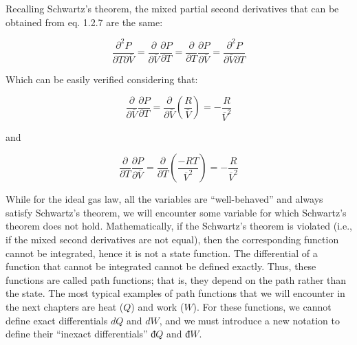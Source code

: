 \documentclass[
  9pt,
]{extbook}
\theoremstyle{definition}
\theoremstyle{definition}
\theoremstyle{definition}
\theoremstyle{remark}
\begin{document}
Recalling Schwartz's theorem, the mixed partial second derivatives that can be obtained from eq. 1.2.7 are the same:

\begin{equation}
  \frac{\partial^2 P}{\partial T \partial \overline{V}}=\frac{\partial}{\partial \overline{V}}\frac{\partial P}{\partial T}=\frac{\partial}{\partial T}\frac{\partial P}{\partial \overline{V}}=\frac{\partial^2 P}{\partial \overline{V} \partial T}
  \label{eq:schwartzP}
\end{equation}

Which can be easily verified considering that:

\begin{equation}
  \frac{\partial}{\partial \overline{V}} \frac{\partial P}{\partial T}  = \frac{\partial}{\partial \overline{V}} \left(\frac{R}{\overline{V}}\right) = -\frac{R}{\overline{V}^2} 
  \label{eq:secondderPA}
\end{equation}

and

\begin{equation}
  \frac{\partial}{\partial T} \frac{\partial P}{\partial \overline{V}}  = \frac{\partial}{\partial T} \left(\frac{-RT}{\overline{V}^2}\right) = -\frac{R}{\overline{V}^2} 
  \label{eq:secondderPB}
\end{equation}

While for the ideal gas law, all the variables are ``well-behaved'' and always satisfy Schwartz's theorem, we will encounter some variable for which Schwartz's theorem does not hold. Mathematically, if the Schwartz's theorem is violated (i.e., if the mixed second derivatives are not equal), then the corresponding function cannot be integrated, hence it is not a state function. The differential of a function that cannot be integrated cannot be defined exactly. Thus, these functions are called path functions; that is, they depend on the path rather than the state. The most typical examples of path functions that we will encounter in the next chapters are heat (\(Q\)) and work (\(W\)). For these functions, we cannot define exact differentials \(dQ\) and \(dW\), and we must introduce a new notation to define their ``inexact differentials'' \(đ Q\) and \(đ W\).
\end{document}
